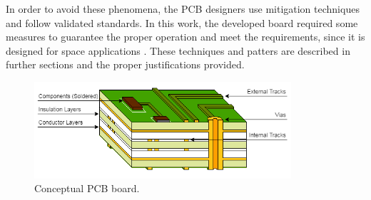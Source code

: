 In order to avoid these phenomena, the PCB designers use mitigation techniques and follow validated standards. In this work, the developed board required some measures to guarantee the proper operation and meet the requirements, since it is designed for space applications \cite{paper_Cezar}. These techniques and patters are described in further sections and the proper justifications provided. 

\begin{figure}[!ht]
    \begin{center}
        \includegraphics[width=0.85\textwidth]{figures/pcb_theory_example.png}
        \caption{Conceptual PCB board.}
        \label{fig:pcb_theory_example}
    \end{center}
\end{figure}




\clearpage